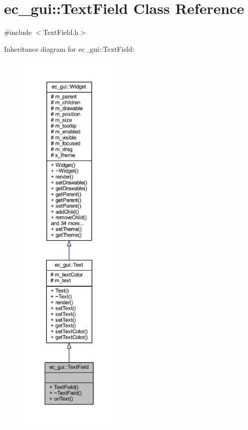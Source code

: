 \hypertarget{classec__gui_1_1_text_field}{}\section{ec\+\_\+gui\+:\+:Text\+Field Class Reference}
\label{classec__gui_1_1_text_field}


{\ttfamily \#include $<$Text\+Field.\+h$>$}



Inheritance diagram for ec\+\_\+gui\+:\+:Text\+Field\+:\nopagebreak
\begin{figure}[H]
\begin{center}
\leavevmode
\includegraphics[height=550pt]{classec__gui_1_1_text_field__inherit__graph}
\end{center}
\end{figure}


